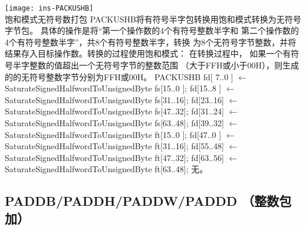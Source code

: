 \begin{instructionblk}
  \texttt{[image: ins-PACKUSHB]} \\
  {饱和模式无符号数打包}
  {PACKUSHB将有符号半字包转换用饱和模式转换为无符号字节包。
  具体的操作是将``第一个操作数的4个有符号整数半字和
  第二个操作数的4个有符号整数半字''，共8个有符号整数半字，转换
  为8个无符号字节整数，并将结果存入目标操作数。转换的过程使用饱和模式：
  在转换过程中， 如果一个有符号半字整数的值超出一个无符号字节的整数范围
  （大于FFH或小于00H），则生成的的无符号整数字节分别为FFH或00H。}
  {PACKUSHB \narrownewline
  fd[ 7..0 ] $\leftarrow$ SaturateSignedHalfwordToUnsignedByte fs[15..0 ]; \narrownewline
  fd[15..8 ] $\leftarrow$ SaturateSignedHalfwordToUnsignedByte fs[31..16]; \narrownewline
  fd[23..16] $\leftarrow$ SaturateSignedHalfwordToUnsignedByte fs[47..32]; \narrownewline
  fd[31..24] $\leftarrow$ SaturateSignedHalfwordToUnsignedByte fs[63..48]; \narrownewline
  fd[39..32] $\leftarrow$ SaturateSignedHalfwordToUnsignedByte ft[15..0 ]; \narrownewline
  fd[47..0 ] $\leftarrow$ SaturateSignedHalfwordToUnsignedByte ft[31..16]; \narrownewline
  fd[55..48] $\leftarrow$ SaturateSignedHalfwordToUnsignedByte ft[47..32]; \narrownewline
  fd[63..56] $\leftarrow$ SaturateSignedHalfwordToUnsignedByte ft[63..48];}
  {无。}
\end{instructionblk}


\subsection{PADDB/PADDH/PADDW/PADDD （整数包加）}


